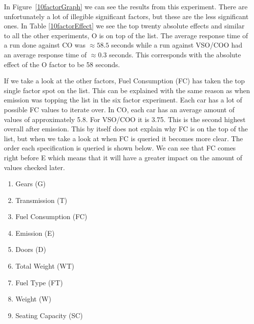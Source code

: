 \documentclass{llncs}
\begin{document}
In Figure~\ref{10factorGraph} we can see the results from this
experiment. There are unfortunately a lot of illegible significant
factors, but these are the less significant ones. In Table
\ref{10factorEffect} we see the top twenty absolute effects and
similar to all the other experiments, O is on top of the list. The
average response time of a run done against CO was $\approx58.5$
seconds while a run against VSO/COO had an average response time of
$\approx0.3$ seconds.  This corresponds with the absolute effect of
the O factor to be 58 seconds.
 
If we take a look at the other factors, Fuel Consumption (FC) has
taken the top single factor spot on the list.  This can be explained
with the same reason as when emission was topping the list in the six
factor experiment. Each car has a lot of possible FC values to iterate
over. In CO, each car has an average amount of values of approximately
5.8. For VSO/COO it is 3.75.  This is the second highest overall after
emission. This by itself does not explain why FC is on the top of the
list, but when we take a look at when FC is queried it becomes more
clear. The order each specification is queried is shown below.  We can
see that FC comes right before E which means that it will have a
greater impact on the amount of values checked later.

 \begin{enumerate}
  
		\item Gears (G)
		\item Transmission (T)
		\item Fuel Consumption (FC)
		\item Emission (E)
		\item Doors (D)
		\item Total Weight (WT)
		\item Fuel Type (FT)
		\item Weight (W)
		\item Seating Capacity (SC)
\end{enumerate}
\end{document}
